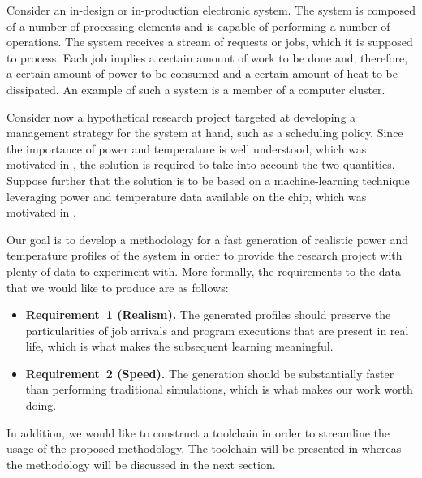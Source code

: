 Consider an in-design or in-production electronic system. The system is composed
of a number of processing elements and is capable of performing a number of
operations. The system receives a stream of requests or jobs, which it is
supposed to process. Each job implies a certain amount of work to be done and,
therefore, a certain amount of power to be consumed and a certain amount of heat
to be dissipated. An example of such a system is a member of a computer cluster.

Consider now a hypothetical research project targeted at developing a management
strategy for the system at hand, such as a scheduling policy. Since the
importance of power and temperature is well understood, which was motivated in
, the solution is required to take into account the two
quantities. Suppose further that the solution is to be based on a
machine-learning technique leveraging power and temperature data available on
the chip, which was motivated in .

Our goal is to develop a methodology for a fast generation of realistic power
and temperature profiles of the system in order to provide the research project
with plenty of data to experiment with. More formally, the requirements to the
data that we would like to produce are as follows:

\begin{itemize}
  \item {\bfseries Requirement~1 (Realism).} The generated profiles should
  preserve the particularities of job arrivals and program executions that are
  present in real life, which is what makes the subsequent learning meaningful.

  \item {\bfseries Requirement~2 (Speed).} The generation should be
  substantially faster than performing traditional simulations, which is what
  makes our work worth doing.
\end{itemize}

In addition, we would like to construct a toolchain in order to streamline the
usage of the proposed methodology. The toolchain will be presented in
 whereas the methodology will be discussed in the next section.
